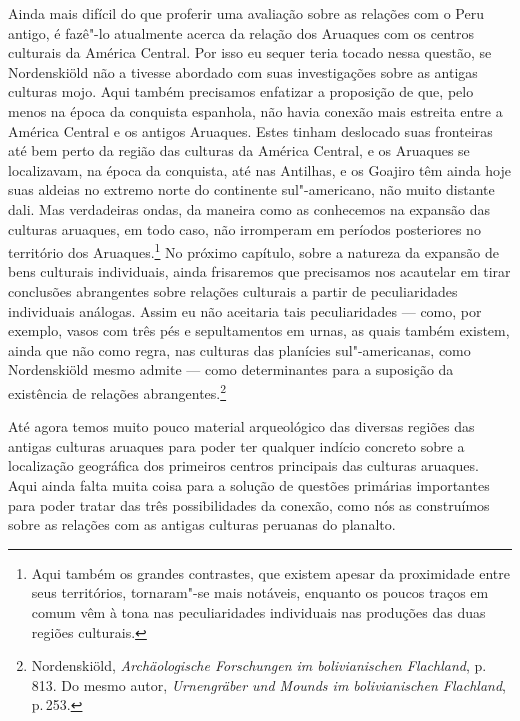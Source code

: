 Ainda mais difícil do que proferir uma avaliação sobre as relações com o
Peru antigo, é fazê"-lo atualmente acerca da relação dos Aruaques com os
centros culturais da América Central. Por isso eu sequer teria tocado
nessa questão, se Nordenskiöld não a tivesse abordado com suas
investigações sobre as antigas culturas mojo. Aqui também precisamos
enfatizar a proposição de que, pelo menos na época da
conquista espanhola, não havia conexão mais estreita entre a América
Central e os antigos Aruaques. Estes tinham deslocado suas fronteiras até
bem perto da região das culturas da América Central, e os Aruaques se
localizavam, na época da conquista, até nas Antilhas, e os Goajiro têm
ainda hoje suas aldeias no extremo norte do continente sul"-americano,
não muito distante dali. Mas verdadeiras ondas, da maneira como as
conhecemos na expansão das culturas aruaques, em todo caso, não
irromperam em períodos posteriores no território dos Aruaques.\footnote{Aqui
também os grandes contrastes, que existem apesar da proximidade entre
seus territórios, tornaram"-se mais notáveis, enquanto os poucos traços
em comum vêm à tona nas peculiaridades individuais nas produções das
duas regiões culturais.} No próximo capítulo, sobre a natureza da
expansão de bens culturais individuais, ainda frisaremos que precisamos
nos acautelar em tirar conclusões abrangentes sobre relações culturais a
partir de peculiaridades individuais análogas. Assim eu não aceitaria
tais peculiaridades --- como, por exemplo, vasos com três pés e
sepultamentos em urnas, as quais também existem, ainda que não como
regra, nas culturas das planícies sul"-americanas, como Nordenskiöld
mesmo admite --- como determinantes para a suposição da existência de
relações abrangentes.\footnote{Nordenskiöld, \textit{Archäologische Forschungen
  im bolivianischen Flachland}, p.\,813. Do mesmo autor,
  \textit{Urnengräber und Mounds im bolivianischen Flachland}, p.\,253.}

Até agora temos muito pouco material arqueológico das diversas regiões
das antigas culturas aruaques para poder ter qualquer indício concreto
sobre a localização geográfica dos primeiros centros principais das
culturas aruaques. Aqui ainda falta muita coisa para a solução de
questões primárias importantes para poder tratar das três
possibilidades da conexão, como nós as construímos sobre as relações com
as antigas culturas peruanas do planalto.

